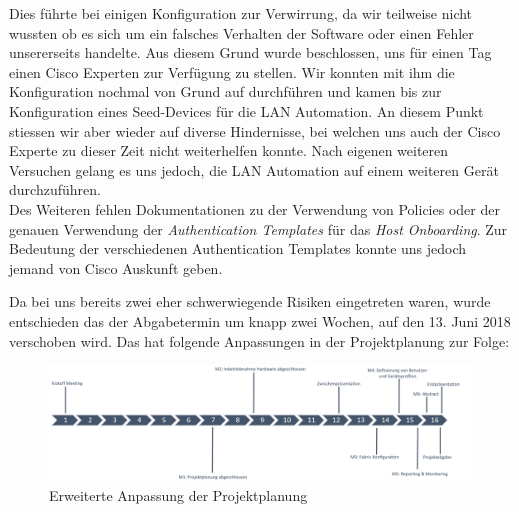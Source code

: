 Dies führte bei einigen Konfiguration zur Verwirrung, da wir teilweise nicht wussten ob es sich um ein falsches Verhalten der Software oder einen Fehler unsererseits handelte. Aus diesem Grund wurde beschlossen, uns für einen Tag einen Cisco Experten zur Verfügung zu stellen. Wir konnten mit ihm die Konfiguration nochmal von Grund auf durchführen und kamen bis zur Konfiguration eines Seed-Devices für die LAN Automation. An diesem Punkt stiessen wir aber wieder auf diverse Hindernisse, bei welchen uns auch der Cisco Experte zu dieser Zeit nicht weiterhelfen konnte. Nach eigenen weiteren Versuchen gelang es uns jedoch, die LAN Automation auf einem weiteren Gerät durchzuführen.\\
Des Weiteren fehlen Dokumentationen zu der Verwendung von Policies oder der genauen Verwendung der \textit{Authentication Templates} für das \textit{Host Onboarding}. Zur Bedeutung der verschiedenen Authentication Templates konnte uns jedoch jemand von Cisco Auskunft geben. 

Da bei uns bereits zwei eher schwerwiegende Risiken eingetreten waren, wurde entschieden das der Abgabetermin um knapp zwei Wochen, auf den 13. Juni 2018 verschoben wird. Das hat folgende Anpassungen in der Projektplanung zur Folge:


\begin{figure}[H]
	\centering
	\includegraphics[width=16cm]{img/ZeitlichePlanung_v4.png}
	\caption{Erweiterte Anpassung der Projektplanung}
	\label{fig:Erweiterte Anpassungen der Projektplanung}
\end{figure} 


